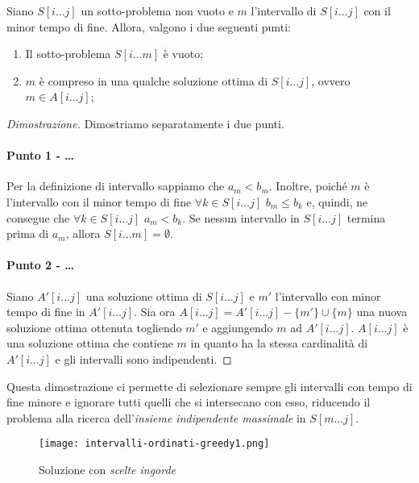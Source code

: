 \begin{definition}
    Siano $S[i\dots j]$ un sotto-problema non vuoto e $m$ l'intervallo di $S[i\dots
    j]$ con il minor tempo di fine. Allora, valgono i due seguenti punti:
    \begin{enumerate}
        \item Il sotto-problema $S[i\dots m]$ è vuoto;
        \item $m$ è compreso in una qualche soluzione ottima di $S[i\dots j]$,
        ovvero $m\in A[i\dots j]$;
    \end{enumerate}
\end{definition}
\begin{proof}[Dimostrazione]
    Dimostriamo separatamente i due punti.

    \paragraph{Punto 1 - \bm{$S[i$}\dots\bm{$ j]=\emptyset$}}
    Per la definizione di intervallo sappiamo che $a_m<b_m$. Inoltre, poiché $m$
    è l'intervallo con il minor tempo di fine $\forall k\in S[i\dots j]$ $b_m
    \leq b_k$ e, quindi, ne consegue che $\forall k\in S[i\dots j]$ $a_m<b_k$.
    Se nessun intervallo in $S[i\dots j]$ termina prima di $a_m$, allora $S[i
    \dots m]=\emptyset$.

    \paragraph*{Punto 2 - \bm{$m\in A[i$}\dots\bm{$i]$}}
    Siano $A'[i\dots j]$ una soluzione ottima di $S[i\dots j]$ e $m'$ l'intervallo
    con minor tempo di fine in $A'[i\dots j]$. Sia ora $A[i\dots j]=A'[i\dots j]
    -\{m'\}\cup\{m\}$ una nuova soluzione ottima ottenuta togliendo $m'$ e
    aggiungendo $m$ ad $A'[i\dots j]$. $A[i\dots j]$ è una soluzione ottima che
    contiene $m$ in quanto ha la stessa cardinalità di $A'[i\dots j]$ e gli
    intervalli sono indipendenti.
\end{proof}

\noindent
Questa dimostrazione ci permette di selezionare sempre gli intervalli con tempo
di fine minore e ignorare tutti quelli che si intersecano con esso, riducendo
il problema alla ricerca dell'\emph{insieme indipendente massimale} in $S[m\dots
j]$.

\begin{figure}[h!]
    \centering
    \texttt{[image: intervalli-ordinati-greedy1.png]}
    \caption{Soluzione con \emph{scelte ingorde}}
\end{figure}

